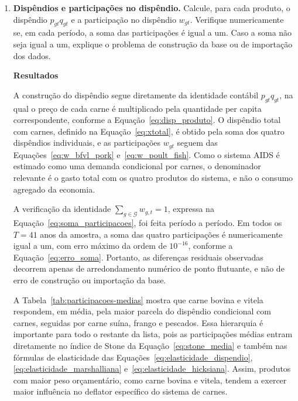 \documentclass[12pt,a4paper]{article}
\begin{document}
\begin{enumerate}[label=\textbf{\arabic*.}]

\item \textbf{Dispêndios e participações no dispêndio.}
Calcule, para cada produto, o dispêndio \(p_{gt}q_{gt}\) e a participação no dispêndio \(w_{gt}\). Verifique numericamente se, em cada período, a soma das participações é igual a um. Caso a soma não seja igual a um, explique o problema de construção da base ou de importação dos dados.

\textbf{Resultados}

A construção do dispêndio segue diretamente da identidade contábil \(p_{gt}q_{gt}\), na qual o preço de cada carne é multiplicado pela quantidade per capita correspondente, conforme a Equação~\eqref{eq:disp_produto}. O dispêndio total com carnes, definido na Equação~\eqref{eq:xtotal}, é obtido pela soma dos quatro dispêndios individuais, e as participações \(w_{gt}\) seguem das Equações~\eqref{eq:w_bfvl_pork} e~\eqref{eq:w_poult_fish}. Como o sistema AIDS é estimado como uma demanda condicional por carnes, o denominador relevante é o gasto total com os quatro produtos do sistema, e não o consumo agregado da economia.

A verificação da identidade \(\sum_{g \in \mathcal{G}}w_{g,t}=1\), expressa na Equação~\eqref{eq:soma_participacoes}, foi feita período a período. Em todos os \(T=41\) anos da amostra, a soma das quatro participações é numericamente igual a um, com erro máximo da ordem de \(10^{-16}\), conforme a Equação~\eqref{eq:erro_soma}. Portanto, as diferenças residuais observadas decorrem apenas de arredondamento numérico de ponto flutuante, e não de erro de construção ou importação da base.



A Tabela~\ref{tab:participacoes-medias} mostra que carne bovina e vitela respondem, em média, pela maior parcela do dispêndio condicional com carnes, seguidas por carne suína, frango e pescados. Essa hierarquia é importante para todo o restante da lista, pois as participações médias entram diretamente no índice de Stone da Equação~\eqref{eq:stone_media} e também nas fórmulas de elasticidade das Equações~\eqref{eq:elasticidade_dispendio}, \eqref{eq:elasticidade_marshalliana} e~\eqref{eq:elasticidade_hicksiana}. Assim, produtos com maior peso orçamentário, como carne bovina e vitela, tendem a exercer maior influência no deflator específico do sistema de carnes.


\end{enumerate}
\end{document}
